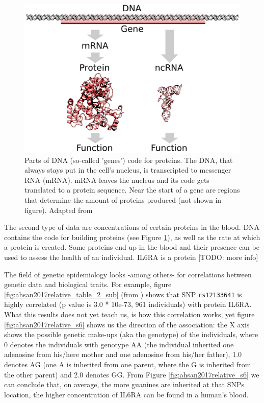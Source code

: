 \begin{figure}[!htbp]
  \centering
  \includegraphics[width=\linewidth]{DNA_to_protein_or_ncRNA.png}
  \caption{
    Parts of DNA (so-called 'genes') code for proteins. 
    The DNA, that always stays put in the cell's nucleus, 
    is transcripted to messenger RNA (mRNA).
    mRNA leaves the nucleus and its code gets translated to 
    a protein sequence.
    Near the start of a gene are regions that determine the amount
    of proteins produced (not shown in figure).
    Adapted from \cite{shafee2015}
  }
  \label{fig:dna_to_protein}
\end{figure}

The second type of data are concentrations of certain proteins in the 
blood. DNA contains the code for building proteins (see Figure 
\ref{fig:dna_to_protein}), 
as well as the rate
at which a protein is created. Some proteins end up in the blood and
their presence can be used to assess the health of an individual.
IL6RA is a protein [TODO: more info]

The field of genetic epidemiology looks -among others- for
correlations between genetic data and biological traits.
For example, figure \ref{fig:ahsan2017relative_table_2_sub} (from \cite{ahsan2017relative}) shows that
SNP \verb|rs12133641| is highly correlated (p value is 3.0 * 10e-73, 
961 individuals) with protein IL6RA. What this results does
not yet teach us, is how this correlation works, yet
figure \ref{fig:ahsan2017relative_s6} shows us the direction of the association:
the X axis shows the possible genetic make-ups (aka the genotype) of the individuals,
where 0 denotes the individuals with genotype
AA (the individual inherited one adenosine 
from his/here mother and one adenosine from his/her father), 
1.0 denotes AG (one A is inherited from one parent, 
where the G is inherited from the other parent) and 2.0 denotes GG.
From Figure \ref{fig:ahsan2017relative_s6} we can conclude that, on average,
the more guanines are inherited at that SNPs location,
the higher concentration of IL6RA can be found in a human's blood.

